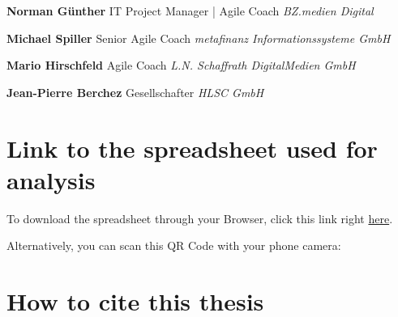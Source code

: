 \textbf{Norman Günther}\newline
{IT Project Manager | Agile Coach}\newline
\textit{BZ.medien Digital}\newline
{}

\textbf{Michael Spiller}\newline
{Senior Agile Coach}\newline
\textit{metafinanz Informationssysteme GmbH}\newline
{}

\textbf{Mario Hirschfeld}\newline
{Agile Coach} \newline
\textit{L.N. Schaffrath DigitalMedien GmbH}

\textbf{Jean-Pierre Berchez}\newline
{Gesellschafter} \newline
\textit{HLSC GmbH}\newline
{}

\newpage
\section{Link to the spreadsheet used for analysis}\label{app:QRCode}
To download the spreadsheet through your Browser, click this link right \textcolor{Violet}{\href{https://github.com/Inf166/mai-joel_maximilian-bachelor_thesis/raw/main/assets/data/data-formated-for-analysis.xlsx}{here}}.

Alternatively, you can scan this QR Code with your phone camera:
\begin{figure}[!ht]
\end{figure}

\section{How to cite this thesis}
